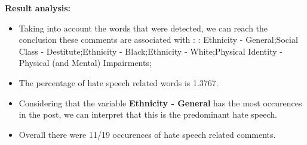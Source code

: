 \documentclass[11pt]{article}
\begin{document}
\textbf{\Large Result analysis:}

\begin{itemize}\item Taking into account the words that were detected, we can reach the conclusion these comments are associated with : : Ethnicity - General;Social Class - Destitute;Ethnicity - Black;Ethnicity - White;Physical Identity - Physical (and Mental) Impairments;%

\item The percentage of hate speech related words is 1.3767.

\item Considering that the variable \textbf{Ethnicity - General} has the most occurences in the post, we can interpret that this is the predominant hate speech.

\item Overall there were 11/19 occurences of hate speech related comments.\end{itemize}
\end{document}
